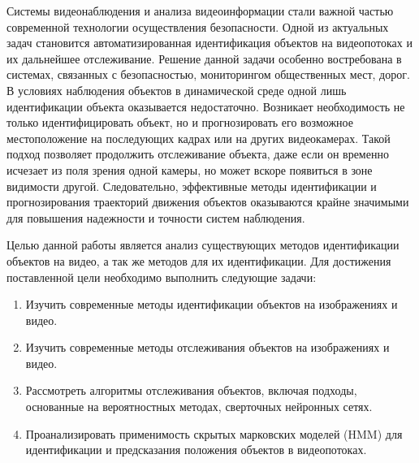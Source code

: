 
\usepackage{hyperref}


\setcounter{page}{2}

\renewcommand{\contentsname}{СОДЕРЖАНИЕ}
\tableofcontents


Системы видеонаблюдения и анализа видеоинформации стали важной частью современной технологии осуществления безопасности. Одной из актуальных задач становится автоматизированная идентификация объектов на видеопотоках и их дальнейшее отслеживание. Решение данной задачи особенно востребована в системах, связанных с безопасностью, мониторингом общественных мест, дорог. В условиях наблюдения объектов в динамической среде одной лишь идентификации объекта оказывается недостаточно. Возникает необходимость не только идентифицировать объект, но и прогнозировать его возможное местоположение на последующих кадрах или на других видеокамерах. Такой подход позволяет продолжить отслеживание объекта, даже если он временно исчезает из поля зрения одной камеры, но может вскоре появиться в зоне видимости другой. Следовательно, эффективные методы идентификации и прогнозирования траекторий движения объектов оказываются крайне значимыми для повышения надежности и точности систем наблюдения.

Целью данной работы является анализ существующих методов идентификации объектов на видео, а так же методов для их идентификации. Для достижения поставленной цели необходимо выполнить следующие задачи:
\begin{enumerate}
    \item Изучить современные методы идентификации объектов на изображениях и видео.
    \item Изучить современные методы отслеживания объектов на изображениях и видео.
    \item Рассмотреть алгоритмы отслеживания объектов, включая подходы, основанные на вероятностных методах, сверточных нейронных сетях.
    \item Проанализировать применимость скрытых марковских моделей (HMM) для идентификации и предсказания положения объектов в видеопотоках.
\end{enumerate}

